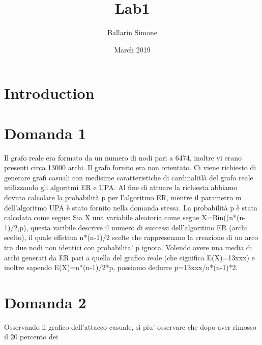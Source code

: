 \documentclass{article}
\title{Lab1}
\author{Ballarin Simone }
\date{March 2019}
\begin{document}
\maketitle

\section{Introduction}
\section{Domanda 1}
Il grafo reale era formato da un numero di nodi pari a 6474, inoltre vi erano presenti circa 13000 archi. Il grafo fornito era non orientato. 
Ci viene richiesto di generare grafi casuali con medisime caratteristiche di cardinalitlà del grafo reale utilizzando gli algoritmi ER e UPA.
Al fine di attuare la richiesta abbiamo dovuto calcolare la probabilità p per l'algoritmo ER, mentre il parametro m dell'algoritmo UPA è stato fornito nella domanda stessa.
La probabilità p è stata calcolata come segue:
Sia X una variabile aleatoria come segue X=Bin((n*(n-1)/2,p), questa varibile descrive il numero di successi dell'algoritmo ER (archi scelto), il quale effettua n*(n-1)/2 scelte che rappresenano la creazione di un arco tra due nodi non identici con probabilita' p ignota.
Volendo avere una media di archi generati da ER pari a quella del grafico reale (che significa E(X)=13xxx) e inoltre sapendo E(X)=n*(n-1)/2*p, possiamo dedurre p=13xxx/n*(n-1)*2.


\section{Domanda 2}
Osservando il grafico dell'attacco casuale, si piu' osservare che dopo aver rimosso il 20 percento dei
\end{document}
